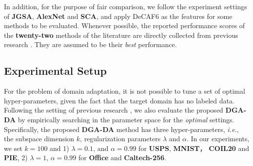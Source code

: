 \documentclass[journal,twocolumn]{IEEEtran}
\begin{document}
\begin{CJK*}{UTF8}{gkai}

In addition, for the purpose of fair comparison, we follow   the experiment settings of \textbf{JGSA}, \textbf{AlexNet} and \textbf{SCA}, and apply DeCAF6 as the features for some methods to be evaluated. Whenever possible,  the reported performance scores of the \textbf{twenty-two} methods of the literature are directly  collected from previous research \cite{long2013transfer,DBLP:journals/tcyb/UzairM17,DBLP:journals/tip/DingF17,DBLP:journals/pami/GhifaryBKZ17,DBLP:journals/tip/XuFWLZ16,Zhang_2017_CVPR}. They are assumed to be their \emph{best} performance.






							
							
\subsection{Experimental Setup}
\label{subsection: Experimental setup}
For the problem of domain adaptation, it is not possible to tune a set of optimal hyper-parameters, given the fact that the target domain has no labeled data. Following the setting of previous research\cite{DBLP:journals/corr/LuoWHC17,long2013transfer,DBLP:journals/tip/XuFWLZ16} , we also evaluate the proposed \textbf{DGA-DA} by empirically searching in the parameter space for the \emph{optimal} settings. Specifically, the proposed \textbf{DGA-DA}  method has three hyper-parameters, \textit{i.e.}, the subspace dimension $k$, regularization parameters $\lambda $ and $\alpha $. In  our experiments, we set $k = 100$ and 1) $\lambda  = 0.1$, and $\alpha  = 0.99$ for \textbf{USPS}, \textbf{MNIST}， \textbf{COIL20} and \textbf{PIE}, 2) $\lambda  = 1$, $\alpha  = 0.99$ for \textbf{Office} and \textbf{Caltech-256}.
							

\end{CJK*}
\end{document}
